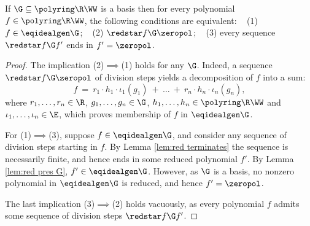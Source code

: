 \begin{lemma} \label{lem:Gr iff}
If $\G\subseteq \polyring \R \WW$ is a \Gr basis then for every polynomial $f\in\polyring \R \WW$, the following conditions are equivalent: \ 
(1) $f\in \eqidealgen \G$; \ 
(2) $\redstar f\G \zeropol$; \ 
(3) every sequence $\redstar f\G f'$ ends in $f'=\zeropol$.
\end{lemma}
%
\begin{proof}
The implication (2)$\implies$(1) holds for any $\G$.
Indeed, a sequence $\redstar f\G \zeropol$  of division steps 
yields a decomposition of $f$ into a
sum:
\[
f \ = \ r_1 \cdot h_1 \cdot \iota_1(g_1) \ + \ \ldots \ + \ r_n \cdot h_n \cdot \iota_n(g_n),
\]
where $r_1, \ldots, r_n\in\R$, $g_1, \ldots, g_n\in\G$, $h_1, \ldots, h_n\in\polyring \R \WW$ and $\iota_1, \ldots, \iota_n\in \E$,
which proves membership of $f$ in $\eqidealgen\G$.

For (1)$\implies$(3),
suppose $f\in\eqidealgen\G$, and consider any sequence of division steps starting in $f$.
By Lemma \ref{lem:red terminates} the sequence is necessarily finite, and hence ends in some 
reduced polynomial $f'$.
By Lemma \ref{lem:red pres G}, $f'\in\eqidealgen\G$.
However, as $\G$ is a \Gr basis,
no nonzero polynomial in $\eqidealgen\G$ is reduced, and hence $f'=\zeropol$.

The last implication (3)$\implies$(2) holds vacuously, as every polynomial $f$ admits some sequence
of division steps $\redstar f \G f'$.
\end{proof}
%


